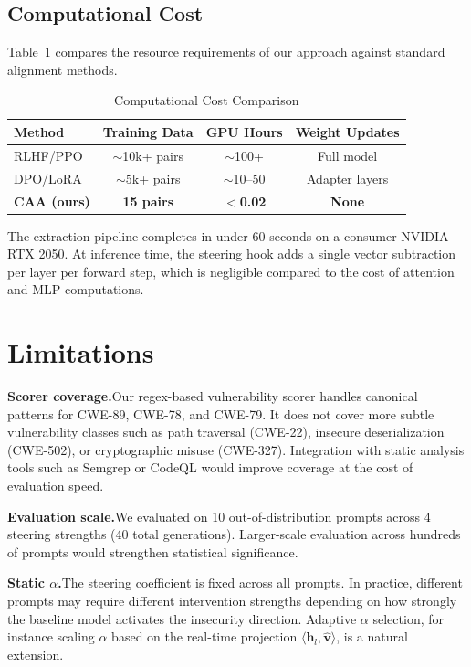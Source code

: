 \documentclass[journal, onecolumn]{IEEEtran}
\begin{document}
\subsection{Computational Cost}

Table~\ref{tab:cost} compares the resource requirements of our approach against standard alignment methods.

\begin{table}[h]
\centering
\caption{Computational Cost Comparison}
\label{tab:cost}
\begin{tabular}{@{}lccc@{}}
\toprule
\textbf{Method} & \textbf{Training Data} & \textbf{GPU Hours} & \textbf{Weight Updates} \\ \midrule
RLHF/PPO & $\sim$10k+ pairs & $\sim$100+ & Full model \\
DPO/LoRA & $\sim$5k+ pairs & $\sim$10--50 & Adapter layers \\
\textbf{CAA (ours)} & \textbf{15 pairs} & \textbf{$<$0.02} & \textbf{None} \\ \bottomrule
\end{tabular}
\end{table}

The extraction pipeline completes in under 60 seconds on a consumer NVIDIA RTX 2050. At inference time, the steering hook adds a single vector subtraction per layer per forward step, which is negligible compared to the cost of attention and MLP computations.

\section{Limitations}
\label{sec:limitations}

\textbf{Scorer coverage.}\quad Our regex-based vulnerability scorer handles canonical patterns for CWE-89, CWE-78, and CWE-79. It does not cover more subtle vulnerability classes such as path traversal (CWE-22), insecure deserialization (CWE-502), or cryptographic misuse (CWE-327). Integration with static analysis tools such as Semgrep or CodeQL would improve coverage at the cost of evaluation speed.

\textbf{Evaluation scale.}\quad We evaluated on 10 out-of-distribution prompts across 4 steering strengths (40 total generations). Larger-scale evaluation across hundreds of prompts would strengthen statistical significance.

\textbf{Static $\alpha$.}\quad The steering coefficient is fixed across all prompts. In practice, different prompts may require different intervention strengths depending on how strongly the baseline model activates the insecurity direction. Adaptive $\alpha$ selection, for instance scaling $\alpha$ based on the real-time projection $\langle \bm{h}_l, \hat{\bm{v}} \rangle$, is a natural extension.
\end{document}
